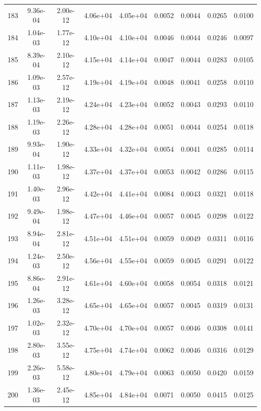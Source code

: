 \begin{longtable}{ccccccccc}
183 & 9.36e-04 & 2.00e-12 & 4.06e+04 & 4.05e+04 & 0.0052 & 0.0044 & 0.0265 & 0.0100 \\
184 & 1.04e-03 & 1.77e-12 & 4.10e+04 & 4.10e+04 & 0.0046 & 0.0044 & 0.0246 & 0.0097 \\
185 & 8.39e-04 & 2.10e-12 & 4.15e+04 & 4.14e+04 & 0.0047 & 0.0044 & 0.0283 & 0.0105 \\
186 & 1.09e-03 & 2.57e-12 & 4.19e+04 & 4.19e+04 & 0.0048 & 0.0041 & 0.0258 & 0.0110 \\
187 & 1.13e-03 & 2.19e-12 & 4.24e+04 & 4.23e+04 & 0.0052 & 0.0043 & 0.0293 & 0.0110 \\
188 & 1.19e-03 & 2.26e-12 & 4.28e+04 & 4.28e+04 & 0.0051 & 0.0044 & 0.0254 & 0.0118 \\
189 & 9.93e-04 & 1.90e-12 & 4.33e+04 & 4.32e+04 & 0.0054 & 0.0041 & 0.0285 & 0.0114 \\
190 & 1.11e-03 & 1.98e-12 & 4.37e+04 & 4.37e+04 & 0.0053 & 0.0042 & 0.0286 & 0.0115 \\
191 & 1.40e-03 & 2.96e-12 & 4.42e+04 & 4.41e+04 & 0.0084 & 0.0043 & 0.0321 & 0.0118 \\
192 & 9.49e-04 & 1.98e-12 & 4.47e+04 & 4.46e+04 & 0.0057 & 0.0045 & 0.0298 & 0.0122 \\
193 & 8.94e-04 & 2.81e-12 & 4.51e+04 & 4.51e+04 & 0.0059 & 0.0049 & 0.0311 & 0.0116 \\
194 & 1.24e-03 & 2.50e-12 & 4.56e+04 & 4.55e+04 & 0.0059 & 0.0045 & 0.0291 & 0.0122 \\
195 & 8.86e-04 & 2.91e-12 & 4.61e+04 & 4.60e+04 & 0.0058 & 0.0054 & 0.0318 & 0.0121 \\
196 & 1.26e-03 & 3.28e-12 & 4.65e+04 & 4.65e+04 & 0.0057 & 0.0045 & 0.0319 & 0.0131 \\
197 & 1.02e-03 & 2.32e-12 & 4.70e+04 & 4.70e+04 & 0.0057 & 0.0046 & 0.0308 & 0.0141 \\
198 & 2.80e-03 & 3.55e-12 & 4.75e+04 & 4.74e+04 & 0.0062 & 0.0046 & 0.0316 & 0.0129 \\
199 & 2.26e-03 & 5.58e-12 & 4.80e+04 & 4.79e+04 & 0.0063 & 0.0050 & 0.0420 & 0.0159 \\
200 & 1.36e-03 & 2.45e-12 & 4.85e+04 & 4.84e+04 & 0.0071 & 0.0050 & 0.0415 & 0.0125 \\
\end{longtable}
